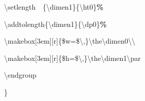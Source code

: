 {{\rule[-0.5ex]{0pt}{2.5ex}\hspace*{2.0em}\textbackslash{}setlength~~\{\textbackslash{}dimen1\}\{\textbackslash{}ht0\}\textcolor{G}{\textbf{\%}}\\
\rule[-0.5ex]{0pt}{2.5ex}\hspace*{2.0em}\textbackslash{}addtolength\{\textbackslash{}dimen1\}\{\textbackslash{}dp0\}\textcolor{G}{\textbf{\%}}\\
\rule[-0.5ex]{0pt}{2.5ex}\hspace*{2.0em}\textbackslash{}makebox[3em][r]\{\$w=\$\textbackslash{},\}\textbackslash{}the\textbackslash{}dimen0\textbackslash{}\textbackslash{}\\
\rule[-0.5ex]{0pt}{2.5ex}\hspace*{2.0em}\textbackslash{}makebox[3em][r]\{\$h=\$\textbackslash{},\}\textbackslash{}the\textbackslash{}dimen1\textbackslash{}par\\
\rule[-0.5ex]{0pt}{2.5ex}\hspace*{1.0em}\textbackslash{}endgroup\\
\rule[-0.5ex]{0pt}{2.5ex}\hspace*{0.0em}\}}%
}%
\endgroup
